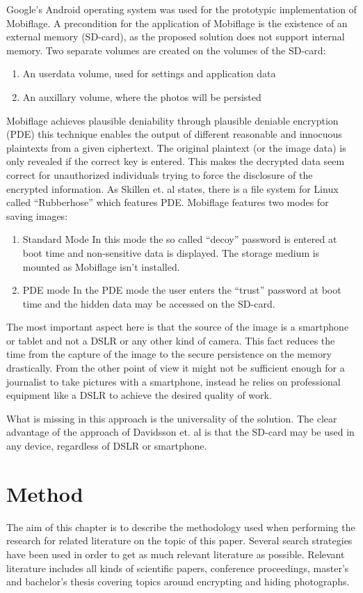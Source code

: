 \documentclass[12pt,a4paper,titlepage,oneside]{scrartcl}
\begin{document}
Google's Android operating system was used for the prototypic implementation of Mobiflage.
A precondition for the application of Mobiflage is the existence of an external memory (SD-card), as the proposed solution does not support internal memory.
Two separate volumes are created on the volumes of the SD-card:
\begin{enumerate}
  \item An userdata volume, used for settings and application data
  \item An auxillary volume, where the photos will be persisted
\end{enumerate}

Mobiflage achieves plausible deniability through plausible deniable encryption (PDE) this technique enables the output of different reasonable and innocuous plaintexts from a given ciphertext.
The original plaintext (or the image data) is only revealed if the correct key is entered.
This makes the decrypted data seem correct for unauthorized individuals trying to force the disclosure of the encrypted information.
As Skillen et. al states, there is a file system for Linux called ``Rubberhose'' which features PDE.
Mobiflage features two modes for saving images: 
\begin{enumerate}
  \item Standard Mode
  In this mode the so called ``decoy'' password is entered at boot time and non-sensitive data is displayed.
  The storage medium is mounted as Mobiflage isn't installed.
  \item PDE mode
  In the PDE mode the user enters the ``trust'' password at boot time and the hidden data may be accessed on the SD-card.
\end{enumerate}

The most important aspect here is that the source of the image is a smartphone or tablet and not a DSLR or any other kind of camera.
This fact reduces the time from the capture of the image to the secure persistence on the memory drastically.
From the other point of view it might not be sufficient enough for a journalist to take pictures with a smartphone, instead he relies on professional equipment like a DSLR to achieve the desired quality of work.

What is missing in this approach is the universality of the solution.
The clear advantage of the approach of Davidsson et. al \cite{Davidsson2016} is that the SD-card may be used in any device, regardless of DSLR or smartphone.

\newpage
\section{Method}
The aim of this chapter is to describe the methodology used when performing the research for related literature on the topic of this paper.
Several search strategies have been used in order to get as much relevant literature as possible.
Relevant literature includes all kinds of scientific papers, conference proceedings, master's and bachelor's thesis covering topics around encrypting and hiding photographs.
\end{document}
